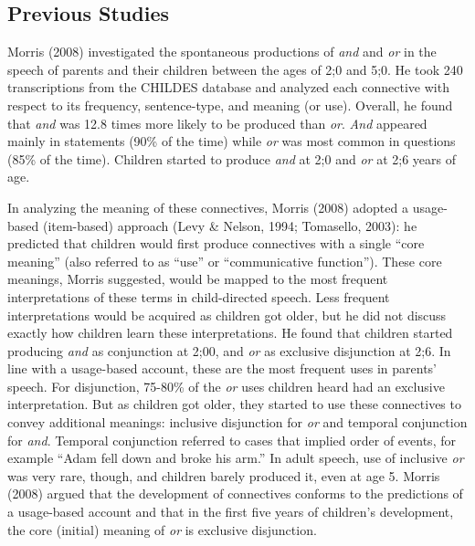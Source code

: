 \documentclass[
  english,
  ,man,floatsintext]{apa6}
\begin{document}
\hypertarget{previous-studies}{%
\subsection{Previous Studies}\label{previous-studies}}

Morris (2008) investigated the spontaneous productions of \emph{and} and \emph{or} in the speech of parents and their children between the ages of 2;0 and 5;0. He took 240 transcriptions from the CHILDES database and analyzed each connective with respect to its frequency, sentence-type, and meaning (or use). Overall, he found that \emph{and} was 12.8 times more likely to be produced than \emph{or}. \emph{And} appeared mainly in statements (90\% of the time) while \emph{or} was most common in questions (85\% of the time). Children started to produce \emph{and} at 2;0 and \emph{or} at 2;6 years of age.

In analyzing the meaning of these connectives, Morris (2008) adopted a usage-based (item-based) approach (Levy \& Nelson, 1994; Tomasello, 2003): he predicted that children would first produce connectives with a single ``core meaning'' (also referred to as ``use'' or ``communicative function''). These core meanings, Morris suggested, would be mapped to the most frequent interpretations of these terms in child-directed speech. Less frequent interpretations would be acquired as children got older, but he did not discuss exactly how children learn these interpretations. He found that children started producing \emph{and} as conjunction at 2;00, and \emph{or} as exclusive disjunction at 2;6. In line with a usage-based account, these are the most frequent uses in parents' speech. For disjunction, 75-80\% of the \emph{or} uses children heard had an exclusive interpretation. But as children got older, they started to use these connectives to convey additional meanings: inclusive disjunction for \emph{or} and temporal conjunction for \emph{and}. Temporal conjunction referred to cases that implied order of events, for example ``Adam fell down and broke his arm.'' In adult speech, use of inclusive \emph{or} was very rare, though, and children barely produced it, even at age 5. Morris (2008) argued that the development of connectives conforms to the predictions of a usage-based account and that in the first five years of children's development, the core (initial) meaning of \emph{or} is exclusive disjunction.
\end{document}
